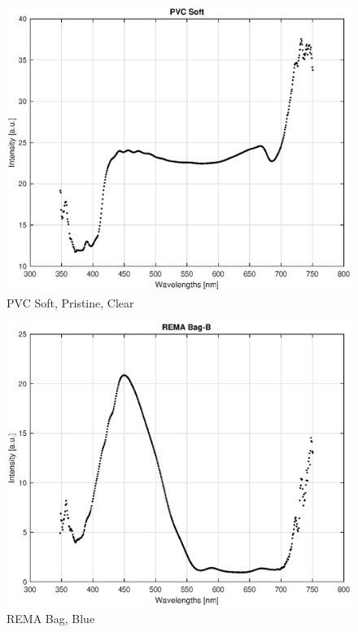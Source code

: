 \begin{appendices}
\begin{figure}
    \centering
    \includegraphics[width = 12cm]{Images/appendix/pvc-soft-pristine-clear.eps}
    \caption{PVC Soft, Pristine, Clear}
    \label{fig:pvc-clear}
\end{figure}

\begin{figure}
    \centering
    \includegraphics[width = 12cm]{Images/appendix/remablue.eps}
    \caption{REMA Bag, Blue}
    \label{fig:remablue}
\end{figure}


\end{appendices}

